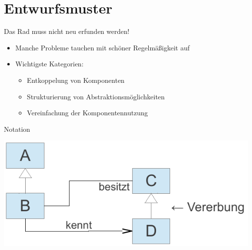 \section{Entwurfsmuster}
\begin{frame}{Das Rad muss nicht neu erfunden werden!}
	\begin{itemize}
		\item Manche Probleme tauchen mit schöner Regelmäßigkeit auf
		\item Wichtigste Kategorien:
		\begin{itemize}
			\item Entkoppelung von Komponenten
			\item Strukturierung von Abstraktionsmöglichkeiten
			\item Vereinfachung der Komponentennutzung
		\end{itemize}
	\end{itemize}

	\begin{block}{Notation}
		\begin{center}
			\includegraphics[width=0.7\linewidth]{images/uml-intro.pdf}
		\end{center}
	\end{block}
\end{frame}

